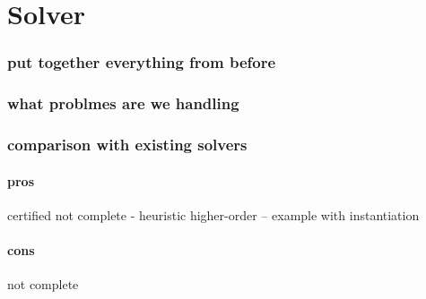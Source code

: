 \chapter{Solver}
\label{chap:solver}


\subsection{put together everything from before}

\subsection{what problmes are we handling}

\subsection{comparison with existing solvers}

\subsubsection{pros}

certified
not complete - heuristic
higher-order -- example with instantiation
\subsubsection{cons}

not complete
